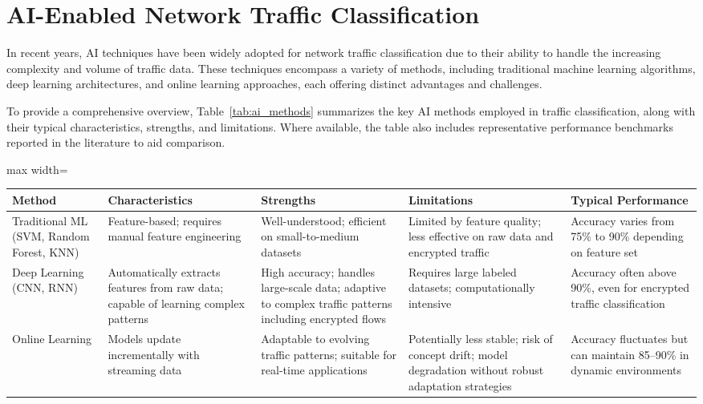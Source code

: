 \documentclass[sigconf]{acmart}
\begin{document}
\section{AI-Enabled Network Traffic Classification}

In recent years, AI techniques have been widely adopted for network traffic classification due to their ability to handle the increasing complexity and volume of traffic data. These techniques encompass a variety of methods, including traditional machine learning algorithms, deep learning architectures, and online learning approaches, each offering distinct advantages and challenges.

To provide a comprehensive overview, Table~\ref{tab:ai_methods} summarizes the key AI methods employed in traffic classification, along with their typical characteristics, strengths, and limitations. Where available, the table also includes representative performance benchmarks reported in the literature to aid comparison.

\begin{table*}[htbp]
\centering
\caption{Summary of AI Methods for Network Traffic Classification}
\label{tab:ai_methods}
\begin{adjustbox}{max width=\textwidth}
\begin{tabular}{@{}lllll@{}}
\toprule
\textbf{Method} & \textbf{Characteristics} & \textbf{Strengths} & \textbf{Limitations} & \textbf{Typical Performance} \\
\midrule
Traditional ML (SVM, Random Forest, KNN) & Feature-based; requires manual feature engineering & Well-understood; efficient on small-to-medium datasets & Limited by feature quality; less effective on raw data and encrypted traffic & Accuracy varies from 75\% to 90\% depending on feature set \\
Deep Learning (CNN, RNN) & Automatically extracts features from raw data; capable of learning complex patterns & High accuracy; handles large-scale data; adaptive to complex traffic patterns including encrypted flows & Requires large labeled datasets; computationally intensive & Accuracy often above 90\%, even for encrypted traffic classification \\
Online Learning & Models update incrementally with streaming data & Adaptable to evolving traffic patterns; suitable for real-time applications & Potentially less stable; risk of concept drift; model degradation without robust adaptation strategies & Accuracy fluctuates but can maintain 85–90\% in dynamic environments \\
\bottomrule
\end{tabular}
\end{adjustbox}
\end{table*}
\end{document}
